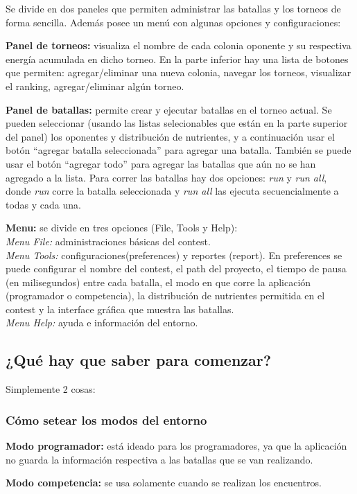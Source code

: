 \documentclass[11pt,a4paper]{article}
\begin{document}
Se divide en dos paneles que permiten administrar las batallas y los torneos de forma sencilla. Además posee un menú con algunas opciones y configuraciones:

{\bf Panel de torneos:} visualiza el nombre de cada colonia oponente y su respectiva energía acumulada en dicho torneo. En la parte inferior hay una lista de botones que permiten: agregar/eliminar una nueva colonia, navegar los torneos, visualizar el ranking, agregar/eliminar algún torneo.

{\bf Panel de batallas:} permite crear y ejecutar batallas en el torneo actual. Se pueden seleccionar (usando las listas selecionables que están en la parte superior del panel) los oponentes y distribución de nutrientes, y a continuación usar el botón ``agregar batalla seleccionada'' para agregar una batalla. También se puede usar el botón ``agregar todo'' para agregar las batallas que aún no se han agregado a la lista.
Para correr las batallas hay dos opciones: {\it run} y {\it run all}, donde {\it run} corre la batalla seleccionada y {\it run all} las ejecuta secuencialmente a todas y cada una.

{\bf Menu:} se divide en tres opciones (File, Tools y Help):\\
{\it Menu File:} administraciones básicas del contest.\\
{\it Menu Tools:} configuraciones(preferences) y reportes (report). En preferences se puede configurar el nombre del contest, el path del proyecto, el tiempo de pausa (en milisegundos) entre cada batalla, el modo en que corre la aplicación (programador o competencia), la distribución de nutrientes permitida en el contest y la interface gráfica que muestra las batallas.\\
{\it Menu Help:} ayuda e información del entorno. 


\subsection{¿Qué hay que saber para comenzar?}

Simplemente 2 cosas:
\subsubsection{Cómo setear los modos del entorno}
{\bf Modo programador:} está ideado para los programadores, ya que la aplicación no guarda la información respectiva a las batallas que se van realizando.

{\bf Modo competencia:} se usa solamente cuando se realizan los encuentros.
\end{document}
